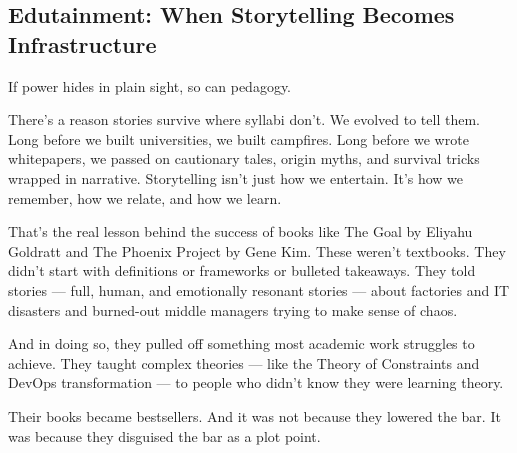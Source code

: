 \subsection{Edutainment: When Storytelling Becomes Infrastructure}

If power hides in plain sight, so can pedagogy.

There’s a reason stories survive where syllabi don’t.
We evolved to tell them. Long before we built universities, we built campfires.
Long before we wrote whitepapers, we passed on cautionary tales, origin myths, and survival tricks wrapped in narrative.
Storytelling isn’t just how we entertain. It’s how we remember, how we relate, and how we learn.

That’s the real lesson behind the success of books like The Goal by Eliyahu Goldratt and The Phoenix Project by Gene Kim.
These weren’t textbooks. They didn’t start with definitions or frameworks or bulleted takeaways.
They told stories — full, human, and emotionally resonant stories — about factories and IT disasters and burned-out middle managers trying to make sense of chaos.

And in doing so, they pulled off something most academic work struggles to achieve.
They taught complex theories — like the Theory of Constraints and DevOps transformation — to people who didn’t know 
they were learning theory.

Their books became bestsellers. And it was not because they lowered the bar. 
It was because they disguised the bar as a plot point.

\medskip

